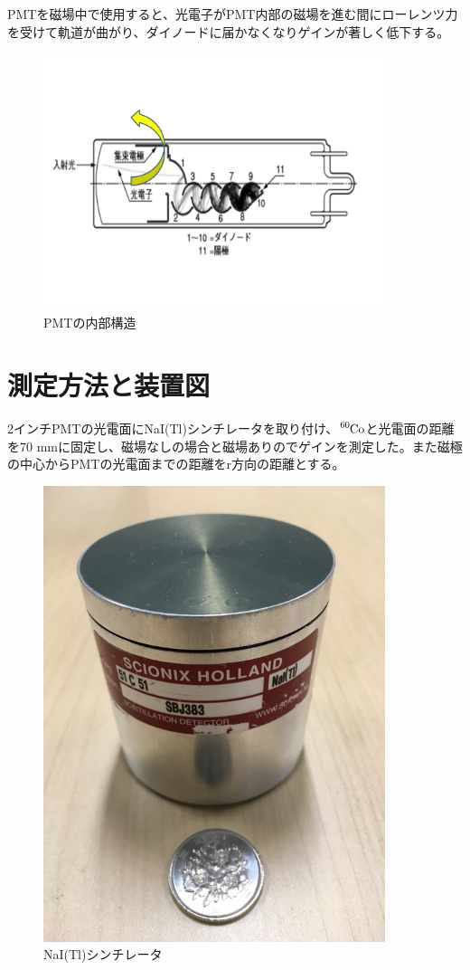 PMTを磁場中で使用すると、光電子がPMT内部の磁場を進む間にローレンツ力を受けて軌道が曲がり、ダイノードに届かなくなりゲインが著しく低下する。

\begin{figure}[H]
	\centering
		\includegraphics[width=10cm]{fig/iguchi/PMTinner.pdf}
	\caption{PMTの内部構造}
	\label{PMTinner}
\end{figure}



\section{測定方法と装置図}
2インチPMTの光電面にNaI(Tl)シンチレータを取り付け、$\ce{^{60}Co}$と光電面の距離を70 mmに固定し、磁場なしの場合と磁場ありのでゲインを測定した。また磁極の中心からPMTの光電面までの距離をr方向の距離とする。

\begin{figure}[htb]
	\centering
		\includegraphics[width=10cm]{fig/iguchi/NaIscinti.jpg}
	\caption{NaI(Tl)シンチレータ}
	\label{NaIscinti}
\end{figure}

